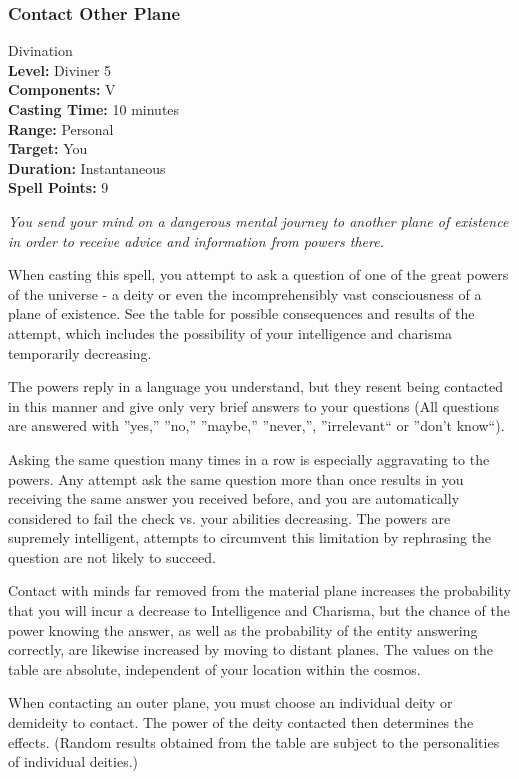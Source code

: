 \subsubsection{Contact Other Plane}
\label{Spell:ContactOtherPlane}
Divination
\\ \textbf{Level:} Diviner 5
\\ \textbf{Components:} V
\\ \textbf{Casting Time:} 10 minutes
\\ \textbf{Range:} Personal
\\ \textbf{Target:} You
\\ \textbf{Duration:} Instantaneous
\\ \textbf{Spell Points:} 9

\emph{You send your mind on a dangerous mental journey to another plane of existence in order to receive advice and information from powers there.}

When casting this spell, you attempt to ask a question of one of the great powers of the universe - a deity or even the incomprehensibly vast consciousness of a plane of existence.
See the  table for possible consequences and results of the attempt, which includes the possibility of your intelligence and charisma temporarily decreasing.

The powers reply in a language you understand, but they resent being contacted in this manner and give only very brief answers to your questions
(All questions are answered with ''yes,'' ''no,'' ''maybe,'' ''never,'', ''irrelevant`` or ''don't know``).

Asking the same question many times in a row is especially aggravating to the powers.
Any attempt ask the same question more than once results in you receiving the same answer you received before,
and you are automatically considered to fail the check vs. your abilities decreasing.
The powers are supremely intelligent, attempts to circumvent this limitation by rephrasing the question are not likely to succeed. 

Contact with minds far removed from the material plane increases the probability that you will incur a decrease to Intelligence and Charisma, 
but the chance of the power knowing the answer, as well as the probability of the entity answering correctly,  are likewise increased by moving to distant planes. The values on the table are absolute, independent of your location within the cosmos.

When contacting an outer plane, you must choose an individual deity or demideity to contact.
The power of the deity contacted then determines the effects.
(Random results obtained from the table are subject to the personalities of individual deities.)

